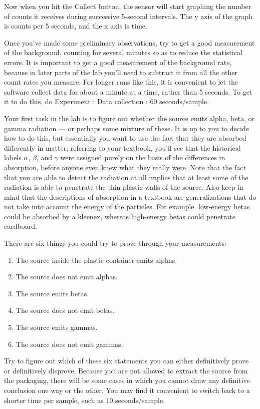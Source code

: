 Now when you hit the Collect button, the sensor will start graphing the number of counts
it receives during successive 5-second intervals. The y axis of the graph is counts
per 5 seconds, and the x axis is time.

Once you've made some preliminary observations, try to get a good measurement of
the background, counting for several minutes so as to reduce the statistical errors.
It is important to get a good measurement of the background rate, because in later
parts of the lab you'll need to subtract it from all the other count rates you measure.
For longer runs like this, it is convenient to let the software collect data for about a minute
at a time, rather than 5 seconds. To get it to do this, do Experiment : Data collection : 60 seconds/sample.


Your first task in the lab is to figure out whether the source emits
alpha, beta, or gamma radiation --- or perhaps some mixture of these.
It is up to you to decide how to do this, but essentially you want to
use the fact that they are absorbed differently in matter; referring
to your textbook, you'll see that the historical labels $\alpha$, $\beta$, and $\gamma$ were assigned
purely on the basis of the differences in absorption, before anyone even knew what they
really were. Note that the fact that you are able to detect the radiation
at all implies that at least some of the radiation is able to penetrate the thin
plastic walls of the source. Also keep in mind that the descriptions of absorption
in a textbook are generalizations that do not take into account the energy of the
particles. For example, low-energy betas could be absorbed by a kleenex, whereas
high-energy betas could penetrate cardboard.

There are six things you could try to prove through your measurements:
\begin{enumerate}
\item The source inside the plastic container emits alphas.
\item The source does not emit alphas.
\item The source emits betas.
\item The source does not emit betas.
\item The source emits gammas.
\item The source does not emit gammas.
\end{enumerate}

Try to figure out which of these six statements you can either definitively prove or
definitively disprove. Because you are not allowed to extract the source from the packaging,
there will be some cases in which you cannot draw any definitive conclusion one way or the other.
You may find it convenient to switch back to a shorter time per sample, such as 10 seconds/sample.

